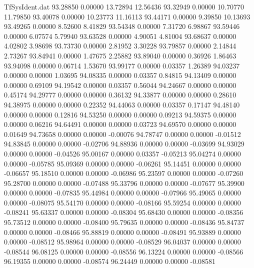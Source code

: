 \begin{filecontents}{TfSysIdent.dat}
  93.28850    0.00000   13.72894   12.56436
  93.32949    0.00000   10.70770   11.79850
  93.40078    0.00000   10.23773   11.16113
  93.44171    0.00000    9.39850   10.13693
  93.49265    0.00000    8.52600    8.41829
  93.54348    0.00000    7.31720    6.98867
  93.59446    0.00000    6.07574    5.79940
  93.63528    0.00000    4.90051    4.81004
  93.68637    0.00000    4.02802    3.98698
  93.73730    0.00000    2.81952    3.30228
  93.79857    0.00000    2.14844    2.73267
  93.84941    0.00000    1.47675    2.25882
  93.89040    0.00000    0.36926    1.86463
  93.94098    0.00000    0.06714    1.53670
  93.99177    0.00000    0.03357    1.26389
  94.03237    0.00000    0.00000    1.03695
  94.08335    0.00000    0.03357    0.84815
  94.13409    0.00000    0.00000    0.69109
  94.19542    0.00000    0.03357    0.56044
  94.24667    0.00000    0.00000    0.45174
  94.29777    0.00000    0.00000    0.36132
  94.33877    0.00000    0.00000    0.28610
  94.38975    0.00000    0.00000    0.22352
  94.44063    0.00000    0.03357    0.17147
  94.48140    0.00000    0.00000    0.12816
  94.53250    0.00000    0.00000    0.09213
  94.59375    0.00000    0.00000    0.06216
  94.64491    0.00000    0.00000    0.03723
  94.69570    0.00000    0.00000    0.01649
  94.73658    0.00000    0.00000   -0.00076
  94.78747    0.00000    0.00000   -0.01512
  94.83845    0.00000    0.00000   -0.02706
  94.88936    0.00000    0.00000   -0.03699
  94.93029    0.00000    0.00000   -0.04526
  95.00167    0.00000    0.03357   -0.05213
  95.04274    0.00000    0.00000   -0.05785
  95.09369    0.00000    0.00000   -0.06261
  95.14451    0.00000    0.00000   -0.06657
  95.18510    0.00000    0.00000   -0.06986
  95.23597    0.00000    0.00000   -0.07260
  95.28700    0.00000    0.00000   -0.07488
  95.33796    0.00000    0.00000   -0.07677
  95.39900    0.00000    0.00000   -0.07835
  95.44984    0.00000    0.00000   -0.07966
  95.49065    0.00000    0.00000   -0.08075
  95.54170    0.00000    0.00000   -0.08166
  95.59254    0.00000    0.00000   -0.08241
  95.63337    0.00000    0.00000   -0.08304
  95.68430    0.00000    0.00000   -0.08356
  95.73512    0.00000    0.00000   -0.08400
  95.79635    0.00000    0.00000   -0.08436
  95.84737    0.00000    0.00000   -0.08466
  95.88819    0.00000    0.00000   -0.08491
  95.93889    0.00000    0.00000   -0.08512
  95.98964    0.00000    0.00000   -0.08529
  96.04037    0.00000    0.00000   -0.08544
  96.08125    0.00000    0.00000   -0.08556
  96.13224    0.00000    0.00000   -0.08566
  96.19355    0.00000    0.00000   -0.08574
  96.24449    0.00000    0.00000   -0.08581

\end{filecontents}
